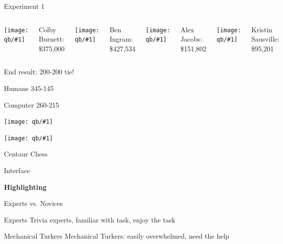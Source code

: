\documentclass[compress]{beamer}
\newcommand{\fsi}[2]{
\begin{frame}[plain]
\vspace*{-1pt}
\makebox[\linewidth]{\texttt{[image: \#1]}}
\begin{center}
#2
\end{center}
\end{frame}
}
\newcommand{\gfxq}[2]{
\begin{center}
	\texttt{[image: qb/\#1]}
\end{center}
}
\begin{document}
\begin{frame}{Experiment 1}

		\begin{columns}
				\gfxq{colby_jeo}{1.0}
                                Colby Burnett:
                                \$375,000
				\gfxq{ben_jeo}{1.0}
                                Ben Ingram:
                                \$427,534
				\gfxq{alex_jeo}{1.0}
                                Alex Jacobs: \$151,802
				\gfxq{kristin_jeo}{1.0}
                                Kristin Sausville: \$95,201
		\end{columns}

                \pause


                \begin{center}
                End result: 200-200 tie!
                \end{center}

\end{frame}

\fsi{qb/hsnct1}{}
\fsi{qb/nasat}{Humans 345-145}
\fsi{qb/hsnct_2017}{Computer 260-215}


\begin{frame}[plain]
\gfxq{seattle_crowd}{.5}
\gfxq{chicago_crowd}{.5}
\end{frame}

\fsi{qb/boring_dot_products}{}

\fsi{simtrans/centaur-chess}{Centaur Chess}


\fsi{qb/augment/screenshot_all}{Interface}

\fsi{qb/augment/screenshot_guesses}{}

\fsi{qb/augment/screenshot_highlight}{{\bf Highlighting}}

\fsi{qb/augment/screenshot_evidence}{}

\begin{frame}{Experts vs. Novices}

 \begin{block}{Experts}
   Trivia experts, familiar with task, enjoy the task
 \end{block}

 \begin{block}{Mechanical Turkers}
   Mechanical Turkers: easily overwhelmed, need the help
 \end{block}

\end{frame}
\end{document}
